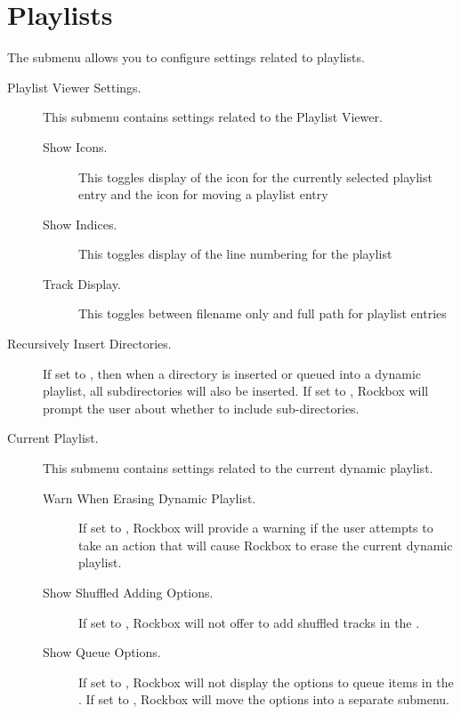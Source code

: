 \section{\label{ref:PlaylistOptions}Playlists}

The  submenu allows you to configure settings
related to playlists.


\begin{description}

\item[Playlist Viewer Settings.]
   This submenu contains settings related to the Playlist Viewer.
   \begin{description}
    \item[Show Icons.] This toggles display of the icon for the currently
    selected playlist entry and the icon for moving a playlist entry
    \item[Show Indices.] This toggles display of the line numbering for
       the playlist
    \item[Track Display.] This toggles between filename only and full path
       for playlist entries
  \end{description}

\item[Recursively Insert Directories.]
  If set to , then when a directory is inserted or queued into a
  dynamic playlist, all subdirectories will also be inserted. If set to ,
  Rockbox will prompt the user about whether to include sub-directories.

\item[Current Playlist.]
  This submenu contains settings related to the current dynamic playlist.
  \begin{description}

  \item[Warn When Erasing Dynamic Playlist.]
  If set to , Rockbox will provide a warning if the user attempts to
  take an action that will cause Rockbox to erase the current dynamic playlist.

  \item[Show Shuffled Adding Options.]
  If set to , Rockbox will not offer to add shuffled tracks
  in the .

  \item[Show Queue Options.]
  If set to , Rockbox will not display the options to queue items in
  the .
  If set to , Rockbox will move the options into a
  separate submenu.

  \end{description}

\end{description}

